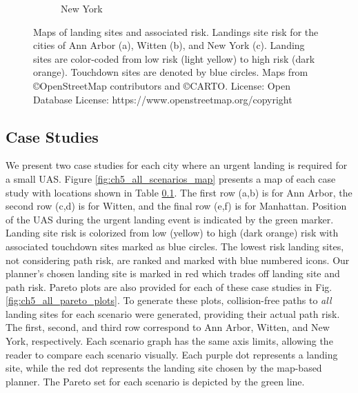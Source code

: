 \begin{figure}[!t]
\begin{subfigure}[b]{0.44\textwidth}
   \caption{New York}\label{fig:ch5_ny_all_risk}
 \end{subfigure}
 \caption[Maps of landing sites and associated risk.]{Maps of landing sites and associated risk. Landings site risk for the cities of Ann Arbor (a), Witten (b), and New York (c). Landing sites are color-coded from low risk (light yellow) to high risk (dark orange). Touchdown sites are denoted by blue circles. Maps from \copyright OpenStreetMap contributors and \copyright CARTO. License: Open Database License: https://www.openstreetmap.org/copyright}\label{fig:ch5_all_ls_risk}
\end{figure}


\subsection{Case Studies}\label{sec:ch5_case_studies}

We present two case studies for each city where an urgent landing is required for a small UAS.  Figure \ref{fig:ch5_all_scenarios_map} presents a map of each case study with locations shown in Table \ref{sec:ch5_case_studies}. The first row (a,b) is for Ann Arbor, the second row (c,d) is for Witten, and the final row (e,f) is for Manhattan. Position of the \ac{UAS} during the urgent landing event is indicated by the green marker. Landing site risk is colorized from low (yellow) to high (dark orange) risk with associated touchdown sites marked as blue circles. The lowest risk landing sites, not considering path risk, are ranked and marked with blue numbered icons. Our planner's chosen landing site is marked in red which trades off landing site and path risk. 
Pareto plots are also provided for each of these case studies in Fig. \ref{fig:ch5_all_pareto_plots}. To generate these plots, collision-free paths to \textit{all} landing sites for each scenario were generated, providing their actual path risk. The first, second, and third row correspond to Ann Arbor, Witten, and New York, respectively.  Each scenario graph has the same axis limits, allowing the reader to compare each scenario visually. Each purple dot represents a landing site, while the red dot represents the landing site chosen by the map-based planner. The Pareto set for each scenario is depicted by the green line. 


